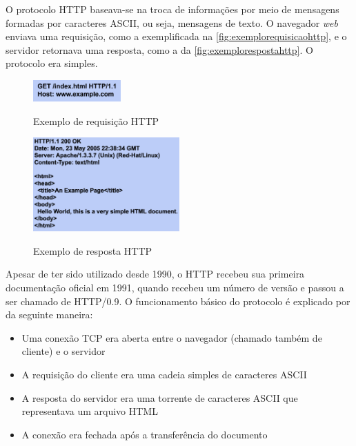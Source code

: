 O protocolo HTTP baseava-se na troca de informações por meio de mensagens formadas por caracteres ASCII, ou seja, mensagens de texto. O navegador \textit{web} enviava uma requisição, como a exemplificada na \autoref{fig:exemplorequisicaohttp}, e o servidor retornava uma resposta, como a da \autoref{fig:exemplorespostahttp}. O protocolo era simples.

\begin{figure}[!htb]
    \centering
    \caption{Exemplo de requisição HTTP}
    \includegraphics[width=0.3\textwidth]{./04-figuras/fund-teorica/http_exemplo_requisicao}
    \label{fig:exemplorequisicaohttp}
\end{figure}

\begin{figure}[!htb]
    \centering
    \caption{Exemplo de resposta HTTP}
    \includegraphics[width=0.5\textwidth]{./04-figuras/fund-teorica/http_exemplo_resposta}
    \label{fig:exemplorespostahttp}
\end{figure}

Apesar de ter sido utilizado desde 1990, o HTTP recebeu sua primeira documentação oficial em 1991, quando recebeu um número de versão e passou a ser chamado de HTTP/0.9. O funcionamento básico do protocolo é explicado por  da seguinte maneira:

\begin{itemize}
	\item Uma conexão TCP era aberta entre o navegador (chamado também de cliente) e o servidor
	\item A requisição do cliente era uma cadeia simples de caracteres ASCII
	\item A resposta do servidor era uma torrente de caracteres ASCII que representava um arquivo HTML
	\item A conexão era fechada após a transferência do documento 
\end{itemize}

